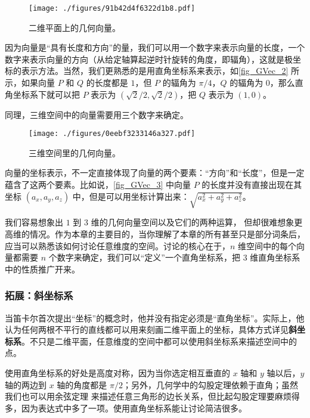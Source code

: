 \begin{figure}[ht]
\centering
\texttt{[image: ./figures/91b42d4f6322d1b8.pdf]}
\caption{二维平面上的几何向量。} \label{fig_GVec_2}
\end{figure}

因为向量是“具有长度和方向”的量，我们可以用一个数字来表示向量的长度，一个数字来表示向量的方向（从给定轴算起逆时针旋转的角度，即辐角），这就是极坐标的表示方法。当然，我们更熟悉的是用直角坐标系来表示，如\autoref{fig_GVec_2} 所示，如果向量 $P$ 和 $Q$ 的长度都是 $1$，但 $P$ 的辐角为 $\pi/4$，$Q$ 的辐角为 $0$，那么直角坐标系下就可以把 $P$ 表示为 $(\sqrt{2}/2, \sqrt{2}/2)$，把 $Q$ 表示为 $(1, 0)$。

同理，三维空间中的向量需要用三个数字来确定。

\begin{figure}[ht]
\centering
\texttt{[image: ./figures/0eebf3233146a327.pdf]}
\caption{三维空间里的几何向量。} \label{fig_GVec_3}
\end{figure}

向量的坐标表示，不一定直接体现了向量的两个要素：“方向”和“长度”，但是一定蕴含了这两个要素。比如说，\autoref{fig_GVec_3} 中向量 $P$ 的长度并没有直接出现在其坐标 $(a_x, a_y, a_z)$ 中，但是可以用坐标计算出来：$\sqrt{a_x^2+a_y^2+a_z^2}$。

我们容易想象出 $1$ 到 $3$ 维的几何向量空间以及它们的两种运算， 但却很难想象更高维的情况。作为本章的主要目的，当你理解了本章的所有甚至只是部分词条后，应当可以熟悉该如何讨论任意维度的空间。讨论的核心在于，$n$ 维空间中的每个向量都需要 $n$ 个数字来确定，我们可以“定义”一个直角坐标系，把 $3$ 维直角坐标系中的性质推广开来。

\subsubsection{拓展：斜坐标系}

当笛卡尔首次提出“坐标”的概念时，他并没有指定必须是“直角坐标”。实际上，他认为任何两根不平行的直线都可以用来刻画二维平面上的坐标，具体方式详见\textbf{斜坐标系}。不只是二维平面，任意维度的空间中都可以使用斜坐标系来描述空间中的点。

使用直角坐标系的好处是高度对称，因为当你选定相互垂直的 $x$ 轴和 $y$ 轴以后，$y$ 轴的两边到 $x$ 轴的角度都是 $\pi/2$；另外，几何学中的勾股定理依赖于直角；虽然我们也可以用余弦定理%
来描述任意三角形的边长关系，但比起勾股定理要麻烦得多，因为表达式中多了一项。使用直角坐标系能让讨论简洁很多。

